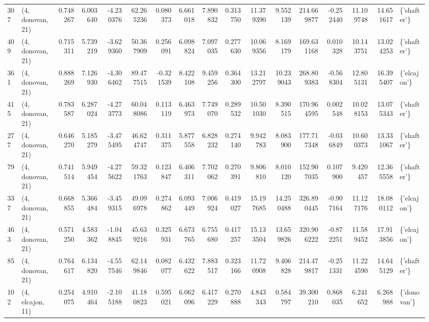 \begin{tabular}{llrrrrrrrrrrrrrrl}
307 &  (4, donovan, 21) &   0.748267 &   6.003640 &  -4.230376 &    62.265236 &   0.080373 &   6.661018 &   7.890832 &  0.313750 &  11.379390 &   9.552139 &   214.669877 &  -0.252440 &  11.109748 &  14.651617 &  \{'shafter'\} \\
409 &  (4, donovan, 21) &   0.715311 &   5.739219 &  -3.629360 &    50.367909 &   0.256091 &   6.098824 &   7.097035 &  0.277630 &  10.069356 &   8.169179 &   169.631168 &   0.010328 &  10.143751 &  13.024253 &  \{'shafter'\} \\
361 &  (4, donovan, 21) &   0.888269 &   7.126930 &  -4.306462 &    89.477515 &  -0.321539 &   8.422108 &   9.459256 &  0.364300 &  13.212797 &  10.239043 &   268.809383 &  -0.568304 &  12.805131 &  16.395407 &  \{'elcajon'\} \\
415 &  (4, donovan, 21) &   0.783587 &   6.287024 &  -4.273773 &    60.048086 &   0.113119 &   6.463973 &   7.749070 &  0.289532 &  10.501030 &   8.390515 &   170.964595 &   0.002548 &  10.028153 &  13.075343 &  \{'shafter'\} \\
277 &  (4, donovan, 21) &   0.646270 &   5.185279 &  -3.475495 &    46.624747 &   0.311375 &   5.877558 &   6.828232 &  0.274140 &   9.942783 &   8.083900 &   177.717348 &  -0.036849 &  10.600373 &  13.331067 &  \{'shafter'\} \\
79  &  (4, donovan, 21) &   0.741514 &   5.949454 &  -4.275622 &    59.321763 &   0.123847 &   6.406311 &   7.702062 &  0.270391 &   9.806810 &   8.010120 &   152.907035 &   0.107900 &   9.420457 &  12.365558 &  \{'shafter'\} \\
337 &  (4, donovan, 21) &   0.668855 &   5.366484 &  -3.459315 &    49.096978 &   0.274862 &   6.093449 &   7.006924 &  0.419027 &  15.197685 &  14.250488 &   326.890445 &  -0.907164 &  11.127176 &  18.080112 &  \{'elcajon'\} \\
463 &  (4, donovan, 21) &   0.571250 &   4.583362 &  -1.048845 &    45.639216 &   0.325931 &   6.673765 &   6.755680 &  0.417257 &  15.133504 &  13.659826 &   320.906222 &  -0.872251 &  11.589452 &  17.913856 &  \{'elcajon'\} \\
85  &  (4, donovan, 21) &   0.764617 &   6.134820 &  -4.557546 &    62.149846 &   0.082077 &   6.432622 &   7.883517 &  0.323166 &  11.720908 &   9.406828 &   214.479817 &  -0.251331 &  11.224590 &  14.645129 &  \{'shafter'\} \\
102 &  (4, elcajon, 11) &   0.254075 &   4.910464 &  -2.105188 &    41.180823 &   0.595021 &   6.062096 &   6.417229 &  0.270888 &   4.843343 &   0.584797 &    39.300210 &   0.868035 &   6.241652 &   6.268988 &  \{'donovan'\} \\

\end{tabular}
